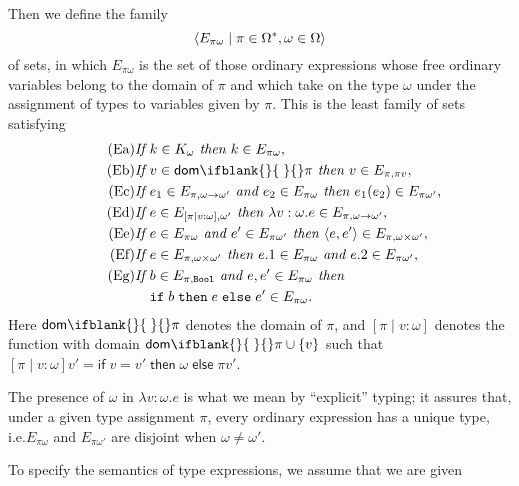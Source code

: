 \documentclass[sigplan,screen,nonacm,balance=false]{acmart}
\makeatletter
\theoremstyle{plain}
\DeclarePairedDelimiter{\set}{\{}{\}}
\DeclarePairedDelimiter{\pair}{\langle}{\rangle}
\newcommand{\ie}{i.e.\@\xspace}
\newcommand{\Bool}{\mathtt{Bool}}
\newcommand{\ifte}[3]{\mathtt{if} \; #1 \; \mathtt{then} \; #2 \; \mathtt{else} \; #3}
\newcommand{\dom}[1]{\mathsf{dom}\ifblank{#1}{\;}{#1}}
\newcommand{\iftem}[3]{\mathsf{if} \; #1 \; \mathsf{then} \; #2 \; \mathsf{else} \; #3}
\makeatother
\begin{document}
Then we define the family
%
\begin{equation*}
  \pair{E_{\pi \omega} \mid \pi \in \Omega^*, \omega \in \Omega}
\end{equation*}
%
of sets, in which $E_{\pi \omega}$ is the set of those ordinary expressions whose free ordinary variables belong to the domain of $\pi$ and which take on the type $\omega$ under the assignment of types to variables given by $\pi$.
This is the least family of sets satisfying
%
\begin{align}
  \tag{Ea}
  \textit{If }& k \in K_\omega \textit{ then } k \in E_{\pi \omega},\\
  \tag{Eb}
  \textit{If }& v \in \dom{} \pi \textit{ then } v \in E_{\pi, \pi v}, \\
  \tag{Ec}
  \textit{If }& e_1 \in E_{\pi, \omega \to \omega'} \textit{ and } e_2 \in E_{\pi \omega} \textit{ then }  e_1(e_2) \in E_{\pi \omega'},\\
  \tag{Ed}
  \textit{If }& e \in E_{[\pi \mid v : \omega], \omega'} \textit{ then } \lambda v : \omega . e \in E_{\pi, \omega \to \omega'}, \\
  \tag{Ee}
  \textit{If }& e \in E_{\pi \omega} \textit{ and } e' \in E_{\pi \omega'} \textit{ then } \pair{e, e'} \in E_{\pi, \omega \times \omega'}, \\
  \tag{Ef}
  \textit{If }& e \in E_{\pi, \omega \times \omega'} \textit{ then } e.1 \in E_{\pi \omega} \textit{ and } e.2 \in E_{\pi \omega'}, \\
  \tag{Eg}
  \textit{If }& b \in E_{\pi, \Bool} \textit{ and } e, e' \in E_{\pi \omega} \textit{ then } \\
  \nonumber
  & \ifte{b}{e}{e'} \in E_{\pi \omega}.
\end{align}
%
Here $\dom{} \pi$ denotes the domain of $\pi$, and $[\pi \mid v : \omega]$ denotes the function with domain $\dom{} \pi \cup \set{v}$ such that $[\pi \mid v : \omega] v' = \iftem{v = v'}{\omega}{\pi v'}$.

The presence of $\omega$ in $\lambda v : \omega . e$ is what we mean by ``explicit'' typing;
it assures that, under a given type assignment $\pi$, every ordinary expression has a unique type, \ie $E_{\pi \omega}$ and $E_{\pi \omega'}$ are disjoint when $\omega \neq \omega'$.

To specify the semantics of type expressions, we assume that we are given
\end{document}
